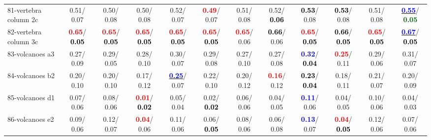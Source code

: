\begin{table}[h]
\begin{center}
{\begin{tabular}{lc|c|c|c|c|c|c|c|c|c|c}
81-vertebra column 2c &   0.51/  0.07 &   0.50/  0.08 &   0.50/  0.08 &   0.52/  0.07 & \textcolor{red}{\textbf{  0.49}}/  0.07 &   0.51/  0.08 &   0.52/\textcolor{black}{\textbf{  0.06}} & \textcolor{black}{\textbf{  0.53}}/  0.08 & \textcolor{black}{\textbf{  0.53}}/  0.08 &   0.51/  0.08 & \underline{\textcolor{blue}{\textbf{  0.55}}}/\textcolor{darkgreen}{\textbf{  0.05}} \\
82-vertebra column 3c & \textcolor{red}{\textbf{  0.65}}/\textcolor{black}{\textbf{  0.05}} & \textcolor{red}{\textbf{  0.65}}/\textcolor{black}{\textbf{  0.05}} & \textcolor{red}{\textbf{  0.65}}/\textcolor{black}{\textbf{  0.05}} & \textcolor{red}{\textbf{  0.65}}/\textcolor{black}{\textbf{  0.05}} & \textcolor{red}{\textbf{  0.65}}/\textcolor{black}{\textbf{  0.05}} & \textcolor{red}{\textbf{  0.65}}/  0.06 & \textcolor{black}{\textbf{  0.66}}/  0.06 & \textcolor{red}{\textbf{  0.65}}/\textcolor{black}{\textbf{  0.05}} & \textcolor{black}{\textbf{  0.66}}/\textcolor{black}{\textbf{  0.05}} & \textcolor{red}{\textbf{  0.65}}/\textcolor{black}{\textbf{  0.05}} & \underline{\textcolor{blue}{\textbf{  0.67}}}/\textcolor{black}{\textbf{  0.05}} \\
83-volcanoes a3 &   0.27/  0.09 &   0.29/  0.05 &   0.28/  0.10 &   0.30/  0.07 &   0.29/  0.08 &   0.27/  0.10 &   0.27/  0.08 & \textcolor{blue}{\textbf{  0.32}}/\textcolor{black}{\textbf{  0.04}} & \textcolor{red}{\textbf{  0.25}}/  0.11 &   0.29/  0.06 &   0.31/  0.07 \\
84-volcanoes b2 &   0.20/  0.10 &   0.20/  0.10 &   0.17/  0.12 & \underline{\textcolor{blue}{\textbf{  0.25}}}/  0.07 &   0.22/  0.10 &   0.20/  0.12 & \textcolor{red}{\textbf{  0.16}}/  0.12 & \textcolor{black}{\textbf{  0.23}}/\textcolor{black}{\textbf{  0.04}} &   0.18/  0.11 &   0.21/  0.07 &   0.20/  0.09 \\
85-volcanoes d1 &   0.07/  0.06 &   0.08/  0.06 & \textcolor{red}{\textbf{  0.01}}/\textcolor{black}{\textbf{  0.02}} &   0.05/  0.04 &   0.02/\textcolor{black}{\textbf{  0.02}} &   0.06/  0.06 &   0.04/  0.05 & \textcolor{blue}{\textbf{  0.11}}/  0.06 &   0.04/  0.05 &   0.10/  0.06 &   0.04/  0.03 \\ \hline
86-volcanoes e2 &   0.09/  0.06 &   0.12/  0.07 & \textcolor{red}{\textbf{  0.04}}/  0.06 &   0.11/  0.06 &   0.06/\textcolor{black}{\textbf{  0.05}} &   0.08/  0.06 &   0.06/  0.08 & \textcolor{blue}{\textbf{  0.13}}/  0.07 & \textcolor{red}{\textbf{  0.04}}/\textcolor{black}{\textbf{  0.05}} &   0.12/  0.06 &   0.07/  0.06 \\

\end{tabular}}
\end{center}
\end{table}
